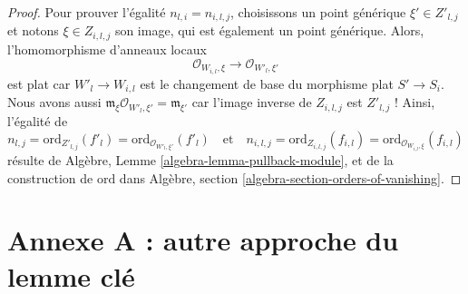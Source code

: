 \begin{proof}
\medskip\noindent
Pour prouver l'égalité $n_{l, i} = n_{i, l, j}$, choisissons un
point générique $\xi' \in Z'_{l, j}$ et notons
$\xi \in Z_{i, l, j}$ son image, qui est également un point générique.
Alors, l'homomorphisme d'anneaux locaux
$$
\mathcal{O}_{W_{i, l}, \xi}
\longrightarrow
\mathcal{O}_{W'_l, \xi'}
$$
est plat car $W'_l \to W_{i, l}$ est le changement de base du morphisme
plat $S' \to S_i$. Nous avons aussi
$\mathfrak m_\xi \mathcal{O}_{W'_l, \xi'} = \mathfrak m_{\xi'}$
car l'image inverse de $Z_{i, l, j}$ est $Z'_{l, j}$ ! Ainsi, l'égalité de
$$
n_{l, j} = \text{ord}_{Z'_{l, j}}(f'_l) =
\text{ord}_{\mathcal{O}_{W'_l, \xi'}}(f'_l)
\quad\text{et}\quad
n_{i, l, j} = \text{ord}_{Z_{i, l, j}}(f_{i, l}) =
\text{ord}_{\mathcal{O}_{W_{i, l}, \xi}}(f_{i, l})
$$
résulte de Algèbre, Lemme \ref{algebra-lemma-pullback-module},
et de la construction de $\text{ord}$ dans
Algèbre, section \ref{algebra-section-orders-of-vanishing}.
\end{proof}












\section{Annexe A : autre approche du lemme clé}
\label{section-appendix-A}

